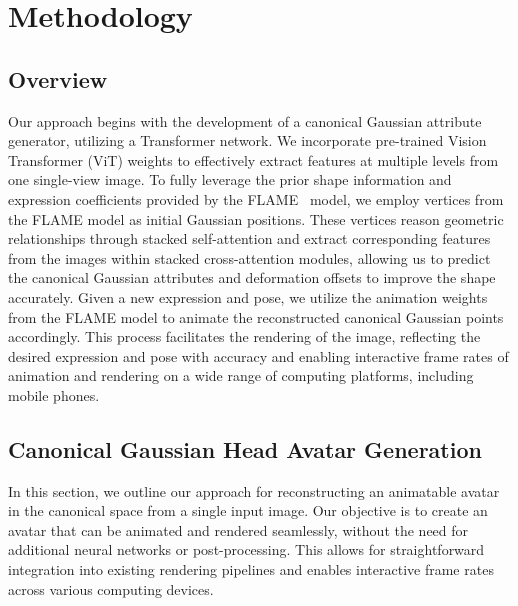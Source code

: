 \section{Methodology}

\subsection{Overview}
Our approach begins with the development of a canonical Gaussian attribute generator, utilizing a Transformer network. We incorporate pre-trained Vision Transformer (ViT) weights to effectively extract features at multiple levels from one single-view image. To fully leverage the prior shape information and expression coefficients provided by the FLAME~\cite{DBLP:journals/tog/LiBBL017} model, we employ vertices from the FLAME model as initial Gaussian positions. These vertices reason geometric relationships through stacked self-attention and extract corresponding features from the images within stacked cross-attention modules, allowing us to predict the canonical Gaussian attributes and deformation offsets to improve the shape accurately.
Given a new expression and pose, we utilize the animation weights from the FLAME model to animate the reconstructed canonical Gaussian points accordingly. This process facilitates the rendering of the image, reflecting the desired expression and pose with accuracy and enabling interactive frame rates of animation and rendering on a wide range of computing platforms, including mobile phones.

\vspace{-0.05in}

\subsection{Canonical Gaussian Head Avatar Generation}
\label{sec:CanonicalGSGen}
In this section, we outline our approach for reconstructing an animatable avatar in the canonical space from a single input image. Our objective is to create an avatar that can be animated and rendered seamlessly, without the need for additional neural networks or post-processing. This allows for straightforward integration into existing rendering pipelines and enables interactive frame rates across various computing devices.

